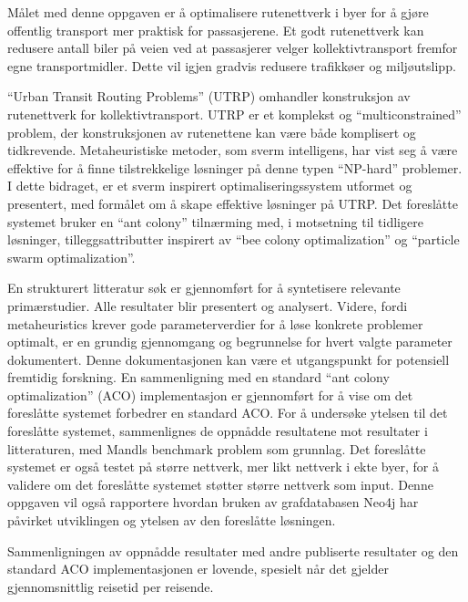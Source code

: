 Målet med denne oppgaven er å optimalisere rutenettverk i byer for å gjøre offentlig transport mer praktisk for passasjerene. Et godt rutenettverk kan redusere antall biler på veien ved at passasjerer velger kollektivtransport fremfor egne transportmidler. Dette vil igjen gradvis redusere trafikkøer og miljøutslipp.

``Urban Transit Routing Problems'' (UTRP) omhandler konstruksjon av rutenettverk for kollektivtransport. UTRP er et komplekst og ``multiconstrained'' problem, der konstruksjonen av rutenettene kan være både komplisert og tidkrevende. Metaheuristiske metoder, som sverm intelligens, har vist seg å være effektive for å finne tilstrekkelige løsninger på denne typen ``NP-hard'' problemer. I dette bidraget, er et sverm inspirert optimaliseringssystem utformet og presentert, med formålet om å skape effektive løsninger på UTRP. Det foreslåtte systemet bruker en ``ant colony'' tilnærming med, i motsetning til tidligere løsninger, tilleggsattributter inspirert av ``bee colony optimalization'' og ``particle swarm optimalization''.

En strukturert litteratur søk er gjennomført for å syntetisere relevante primærstudier. Alle resultater blir presentert og analysert. Videre, fordi metaheuristics krever gode parameterverdier for å løse konkrete problemer optimalt, er en grundig gjennomgang og begrunnelse for hvert valgte parameter dokumentert. Denne dokumentasjonen kan være et utgangspunkt for potensiell fremtidig forskning. En sammenligning med en standard ``ant colony optimalization'' (ACO) implementasjon er gjennomført for å vise om det foreslåtte systemet forbedrer en standard ACO. For å undersøke ytelsen til det foreslåtte systemet, sammenlignes de oppnådde resultatene mot resultater i litteraturen, med Mandls benchmark problem som grunnlag. Det foreslåtte systemet er også testet på større nettverk, mer likt nettverk i ekte byer, for å validere om det foreslåtte systemet støtter større nettverk som input. Denne oppgaven vil også rapportere hvordan bruken av grafdatabasen Neo4j har påvirket utviklingen og ytelsen av den foreslåtte løsningen.

Sammenligningen av oppnådde resultater med andre publiserte resultater og den standard ACO implementasjonen er lovende, spesielt når det gjelder gjennomsnittlig reisetid per reisende.
